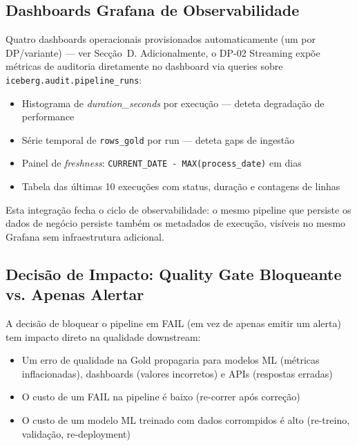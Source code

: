 \documentclass[11pt,a4paper]{article}
\begin{document}
\subsection{Dashboards Grafana de Observabilidade}

Quatro dashboards operacionais provisionados automaticamente (um por DP/variante) --- ver Secção~D. Adicionalmente, o DP-02 Streaming expõe métricas de auditoria diretamente no dashboard via queries sobre \texttt{iceberg.audit.pipeline\_runs}:

\begin{itemize}[leftmargin=*,noitemsep]
  \item Histograma de \textit{duration\_seconds} por execução --- deteta degradação de performance
  \item Série temporal de \texttt{rows\_gold} por run --- deteta gaps de ingestão
  \item Painel de \textit{freshness}: \texttt{CURRENT\_DATE - MAX(process\_date)} em dias
  \item Tabela das últimas 10 execuções com status, duração e contagens de linhas
\end{itemize}

Esta integração fecha o ciclo de observabilidade: o mesmo pipeline que persiste os dados de negócio persiste também os metadados de execução, visíveis no mesmo Grafana sem infraestrutura adicional.

\subsection{Decisão de Impacto: Quality Gate Bloqueante vs. Apenas Alertar}

A decisão de bloquear o pipeline em FAIL (em vez de apenas emitir um alerta) tem impacto direto na qualidade downstream:

\begin{itemize}[leftmargin=*,noitemsep]
  \item Um erro de qualidade na Gold propagaria para modelos ML (métricas inflacionadas), dashboards (valores incorretos) e APIs (respostas erradas)
  \item O custo de um FAIL na pipeline é baixo (re-correr após correção)
  \item O custo de um modelo ML treinado com dados corrompidos é alto (re-treino, validação, re-deployment)
\end{itemize}

\end{document}
